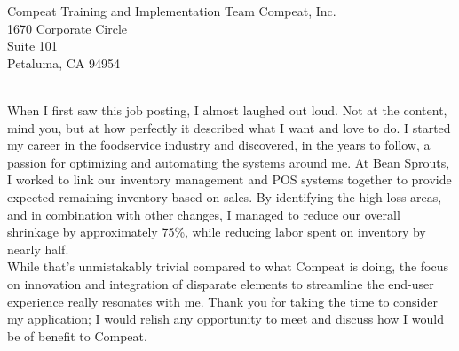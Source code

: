 \documentclass{resume}
\begin{document}




\recipient
  {Compeat Training and Implementation Team}
  {Compeat, Inc.\\1670 Corporate Circle\\Suite 101\\Petaluma, CA 94954}



\makelettertitle
\begin{cvletter}
\\
When I first saw this job posting, I almost laughed out loud. Not at the content, mind you, but at how perfectly it described what I want and love to do. I started my career in the foodservice industry and discovered, in the years to follow, a passion for optimizing and automating the systems around me. At Bean Sprouts, I worked to link our inventory management and POS systems together to provide expected remaining inventory based on sales. By identifying the high-loss areas, and in combination with other changes, I managed to reduce our overall shrinkage by approximately 75\%, while reducing labor spent on inventory by nearly half.\\
While that's unmistakably trivial compared to what Compeat is doing, the focus on innovation and integration of disparate elements to streamline the end-user experience really resonates with me. Thank you for taking the time to consider my application; I would relish any opportunity to meet and discuss how I would be of benefit to Compeat.
\end{cvletter}


\makeletterclosing
\end{document}
